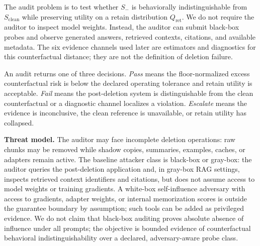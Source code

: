 The audit problem is to test whether $S_-$ is behaviorally indistinguishable from $S_{\mathrm{clean}}$ while preserving utility on a retain distribution $Q_{\mathrm{ret}}$. We do not require the auditor to inspect model weights. Instead, the auditor can submit black-box probes and observe generated answers, retrieved contexts, citations, and available metadata. The six evidence channels used later are estimators and diagnostics for this counterfactual distance; they are not the definition of deletion failure.

An audit returns one of three decisions. \emph{Pass} means the floor-normalized excess counterfactual risk is below the declared operating tolerance and retain utility is acceptable. \emph{Fail} means the post-deletion system is distinguishable from the clean counterfactual or a diagnostic channel localizes a violation. \emph{Escalate} means the evidence is inconclusive, the clean reference is unavailable, or retain utility has collapsed.

\textbf{Threat model.}
The auditor may face incomplete deletion operations: raw chunks may be removed while shadow copies, summaries, examples, caches, or adapters remain active. The baseline attacker class is black-box or gray-box: the auditor queries the post-deletion application and, in gray-box RAG settings, inspects retrieved context identifiers and citations, but does not assume access to model weights or training gradients. A white-box self-influence adversary with access to gradients, adapter weights, or internal memorization scores is outside the guarantee boundary by assumption; such tools can be added as privileged evidence. We do not claim that black-box auditing proves absolute absence of influence under all prompts; the objective is bounded evidence of counterfactual behavioral indistinguishability over a declared, adversary-aware probe class.
